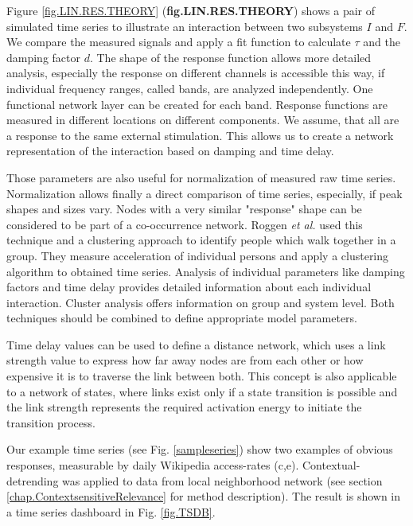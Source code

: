 \documentclass[a4paper,10pt]{scrbook}
\begin{document}
Figure \ref{fig.LIN.RES.THEORY} (\textbf{fig.LIN.RES.THEORY}) shows a pair of simulated time series to illustrate an interaction between two subsystems $I$ and $F$. We compare the measured signals and apply a fit function to calculate $\tau$ and the damping factor $d$. The shape of the response function allows more detailed analysis, especially the response on different channels is accessible this way, if individual frequency ranges, called bands, are analyzed independently. One functional network layer can be created for each band. Response functions are measured in different locations on different components. We assume, that all are a response to the same external stimulation. This allows us to create a network representation of the interaction based on damping and time delay. 

Those parameters are also useful for normalization of measured raw time series. Normalization allows finally a direct comparison of time series, especially, if peak shapes and sizes vary. Nodes with a very similar "response" shape can be considered to be part of a co-occurrence network. Roggen \textit{et al.} \cite{Roggen2011} used this technique and a clustering approach to identify people which walk together in a group. They measure acceleration of individual persons and apply a clustering algorithm to obtained time series. Analysis of individual parameters like damping factors and time delay provides detailed information about each individual interaction. Cluster analysis offers information on group and system level. Both techniques should be combined to define appropriate model parameters. 

Time delay values can be used to define a distance network, which uses a link strength value to express how far away nodes are from each other or how expensive it is to traverse the link between both. This concept is also applicable to a network of states, where links exist only if a state transition is possible and the link strength represents the required activation energy to initiate the transition process.  

Our example time series (see Fig. \ref{sampleseries}) show two examples of obvious responses, measurable by daily Wikipedia access-rates (c,e). Contextual-detrending was applied to data from local neighborhood network (see section \ref{chap.ContextsensitiveRelevance} for method description). The result is shown in a time series dashboard in Fig. \ref{fig.TSDB}.
\end{document}
